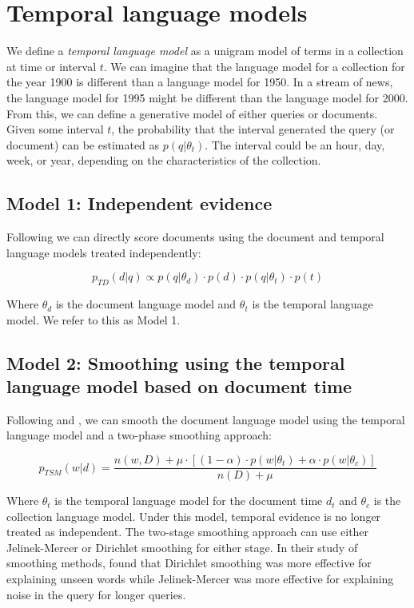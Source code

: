 \documentclass{sig-alternate}
\begin{document}
\section{Temporal language models}

We define a \textit{temporal language model} as a unigram model of terms in a collection at time or interval $t$.  We can imagine that the language model for a collection for the year 1900 is different than a language model for 1950.  In a stream of news, the language model for 1995 might be different than the language model for 2000. From this, we can define a generative model of either queries or documents. Given some interval $t$, the probability that the interval generated the query (or document) can be estimated as $p(q \vert \theta_t)$. The interval could be an hour, day, week, or year, depending on the characteristics of the collection.

\subsection{Model 1: Independent evidence}

Following \cite{Dakka2012} we can directly score documents using the document and temporal language models treated independently: 

\[ 
p_{TD}(d \vert q) \propto p(q \vert \theta_d) \cdot p(d) \cdot p(q \vert \theta_t) \cdot p(t)
\]

Where $\theta_d$ is the document language model and $\theta_t$ is the temporal language model. We refer to this as Model 1.

\subsection{Model 2: Smoothing using the temporal language model based on document time}

Following \cite{Liu2004} and \cite{Wei2006}, we can smooth the document language model using the temporal language model and a two-phase smoothing approach:

\[
p_{TSM}(w \vert d) = \dfrac{n(w,D) + \mu \cdot \left[ (1-\alpha) \cdot p(w\vert \theta_t) + \alpha \cdot p(w \vert \theta_c)\right]}{n(D) + \mu}
\]

Where $\theta_t$ is the temporal language model for the document time $d_t$ and  $\theta_c$ is the collection language model. Under this model, temporal evidence is no longer treated as independent. The two-stage smoothing approach can use either Jelinek-Mercer or Dirichlet smoothing for either stage.  In their study of smoothing methods, \cite{Zhai2004} found that Dirichlet smoothing was more effective for explaining unseen words while Jelinek-Mercer was more effective for explaining noise in the query for longer queries.
\end{document}
